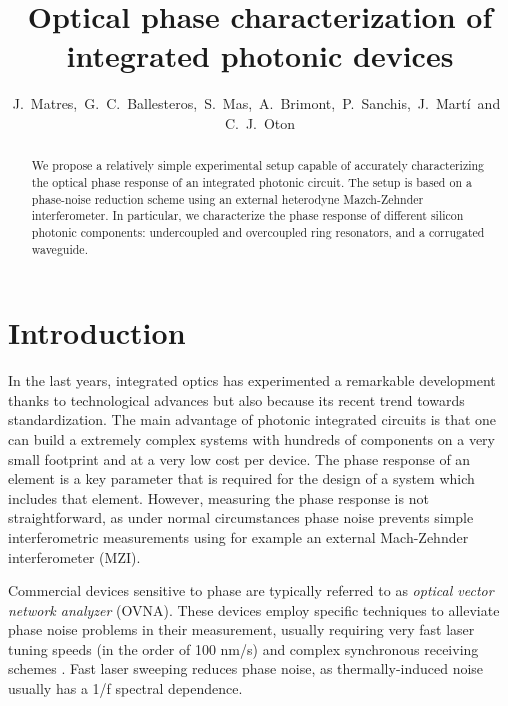\documentclass[journal]{IEEEtran}
\begin{document}
\title{Optical phase characterization of integrated photonic devices}
\author{J.~Matres,~G.~C.~Ballesteros,~S.~Mas,~A.~Brimont,~P.~Sanchis,~J.~Mart\'i~and~C.~J.~Oton}

\maketitle


\begin{abstract}
We propose a relatively simple experimental setup capable of accurately characterizing the optical phase response of an integrated photonic circuit. The setup is based on a phase-noise reduction scheme using an external heterodyne Mazch-Zehnder interferometer. In particular, we characterize the phase response of different silicon photonic components: undercoupled and overcoupled ring resonators, and a corrugated  waveguide.

\end{abstract}

\section{Introduction}
\noindent In the last years, integrated optics has experimented a remarkable development thanks to technological advances but also because its recent trend towards standardization.
The main advantage of photonic integrated circuits is that one can build a extremely complex systems with hundreds of components on a very small footprint and at a very low cost per device.
The phase response of an element is a key parameter that is required for the design of a system which includes that element. However, measuring the phase response is not straightforward, as under normal circumstances phase noise prevents simple interferometric measurements using for example an external Mach-Zehnder interferometer (MZI).

Commercial devices sensitive to phase are typically referred to as \emph{optical vector network analyzer} (OVNA). These devices employ specific techniques to alleviate phase noise problems in their measurement, usually requiring very fast laser tuning speeds (in the order of 100 nm/s) and complex synchronous receiving schemes \cite{Vanwiggeren2003, Gifford2005}. Fast laser sweeping reduces phase noise, as thermally-induced noise usually has a 1/f spectral dependence.
\end{document}
